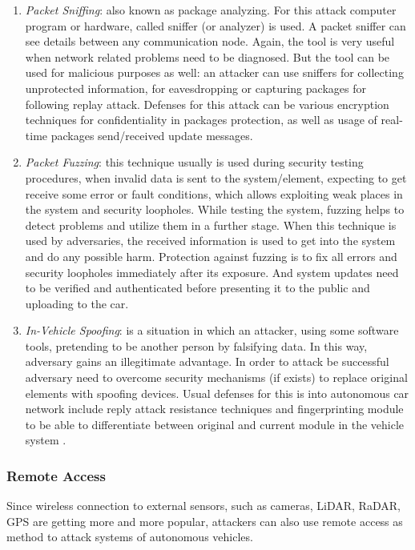 \begin{enumerate}
\begin{enumerate}
		\item \textit{Packet Sniffing}: also known as package analyzing. For this attack computer program or hardware, called sniffer (or analyzer) is used. A packet sniffer can see details between any communication node.  Again, the tool is very useful when network related problems need to be diagnosed. But the tool can be used for malicious purposes as well: an attacker can use sniffers for collecting unprotected information, for eavesdropping or capturing packages for following replay attack. Defenses for this attack can be various encryption techniques for confidentiality in packages protection, as well as usage of real-time packages send/received update messages.
		\item \textit{Packet Fuzzing}: this technique usually is used during security testing procedures, when invalid data is sent to the system/element, expecting to get receive some error or fault conditions, which allows exploiting weak places in the system and security loopholes. While testing the system, fuzzing helps to detect problems and utilize them in a further stage. When this technique is used by adversaries, the received information is used to get into the system and do any possible harm. Protection against fuzzing is to fix all errors and security loopholes immediately after its exposure. And system updates need to be verified and authenticated before presenting it to the public and uploading to the car.
		\item \textit{In-Vehicle Spoofing}: is a situation in which an attacker, using some software tools, pretending to be another person by falsifying data. In this way, adversary gains an illegitimate advantage. In order to attack be successful adversary need to overcome security mechanisms (if exists) to replace original elements with spoofing devices. Usual defenses for this is into autonomous car network include reply attack resistance techniques and fingerprinting module to be able to differentiate between original and current module in the vehicle system \cite{attacTax1}.
	\end{enumerate}
\end{enumerate}

\subsubsection{Remote Access}
Since wireless connection to external sensors, such as cameras, \gls{LiDAR}, \gls{RaDAR}, \gls{GPS} are getting more and more popular, attackers can also use remote access as method to attack systems of autonomous vehicles. 

